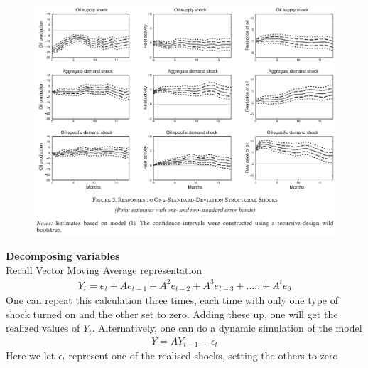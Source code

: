 \documentclass{beamer}
\begin{document}
\begin{frame}
  \begin{figure}
    \includegraphics[scale=.7]{killian3.eps}
  \end{figure}
\end{frame}

\begin{frame}
  \textbf{Decomposing variables}\\
  Recall Vector Moving Average representation    
\begin{align*}
  Y_t = e_t + Ae_{t-1} + A^2e_{t-2} + A^3e_{t-3} + ..... + A^te_0
\end{align*}
\medskip
One can repeat this calculation three times, each time with only one type of shock turned on and the other set to zero. 
Adding these up, one will get the realized values of $Y_t$.
Alternatively, one can do a dynamic simulation of the model
\begin{align*}
  Y=AY_{t-1}+\epsilon_t
\end{align*}
Here we let $\epsilon_t$ represent one of the realised shocks, setting the others to zero
\end{frame}
\end{document}
